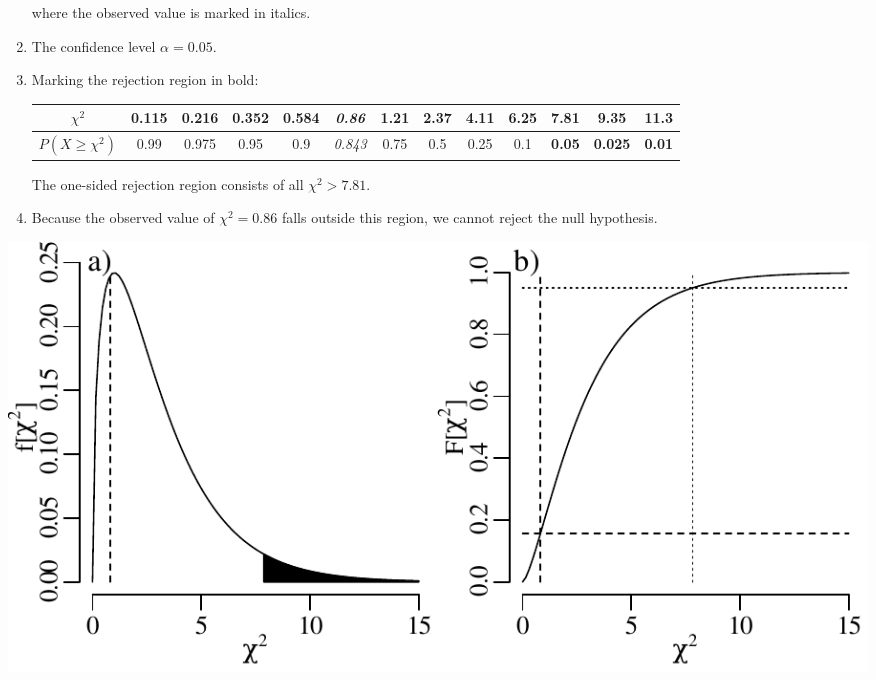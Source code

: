 \begin{enumerate}
  \noindent where the observed value is marked in italics.
  
\item The confidence level $\alpha = 0.05$.

\item Marking the rejection region in bold:
  
  \begin{center}
    \begin{tabular}{c|c@{\gap}c@{\gap}c@{\gap}c@{\gap}
        c@{\gap}c@{\gap}c@{\gap}c@{\gap}c@{\gap}c@{\gap}c@{\gap}c}
      $\chi^2$ & 0.115 & 0.216 & 0.352 & 0.584 & \textit{0.86} &
      1.21 & 2.37 & 4.11 & 6.25 & \textbf{7.81} &
      \textbf{9.35} & \textbf{11.3} \\ \hline
      $P(X\geq{\chi^2})$ & 0.99 & 0.975 & 0.95 & 0.9 & \textit{0.843} & 
      0.75 & 0.5 & 0.25 & 0.1 & \textbf{0.05} &
      \textbf{0.025} & \textbf{0.01}
    \end{tabular}
  \end{center}

  The one-sided rejection region consists of all $\chi^2>{7.81}$.

\item Because the observed value of $\chi^2=0.86$ falls outside this
  region, we cannot reject the null hypothesis.

\end{enumerate}

\noindent\begin{minipage}[t][][b]{.6\textwidth}
  \includegraphics[]{../figures/chi22.pdf}\medskip
\end{minipage}
\begin{minipage}[t][][t]{.4\textwidth}
  \label{fig:chi22}
\end{minipage}

